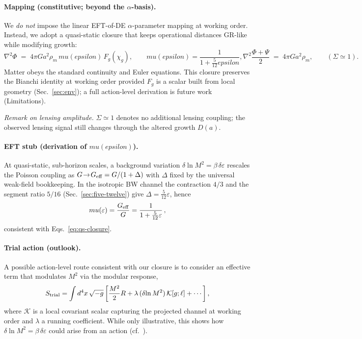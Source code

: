\documentclass[aps,prd,onecolumn,superscriptaddress,nofootinbib]{revtex4-2}
\def\eps{epsilon}%
\def\mu{mu}%
\def\alpha{alpha}%
\def\alpha_M{alphaM}%
\providecommand{\eps}{\varepsilon}
\providecommand{\be}{\begin{equation}}
\providecommand{\ee}{\end{equation}}
\providecommand{\bse}{\begin{subequations}}
\providecommand{\ese}{\end{subequations}}
\begin{document}
\paragraph{Mapping (constitutive; beyond the \texorpdfstring{$\alpha$}{alpha}-basis).}
We \emph{do not} impose the linear EFT-of-DE $\alpha$-parameter mapping at working order. Instead, we adopt a quasi-static closure that keeps operational distances GR-like while modifying growth:
\bse
\label{eq:qs-closure}
\be
\nabla^2\Phi \;=\; 4\pi G a^2 \rho_m \,\mu(\eps)\,F_g(\chi_g), \qquad \mu(\eps)=\frac{1}{1+\tfrac{5}{12}\eps}, 
\ee
\be
\nabla^2\frac{\Phi+\Psi}{2} \;=\; 4\pi G a^2 \rho_m ,\qquad (\Sigma\simeq 1).
\ee
\ese
Matter obeys the standard continuity and Euler equations. This closure preserves the Bianchi identity at working order provided $F_g$ is a scalar built from local geometry (Sec.~\ref{sec:env}); a full action-level derivation is future work (Limitations).

\noindent\emph{Remark on lensing amplitude.} $\Sigma\simeq 1$ denotes no additional lensing coupling; the observed lensing signal still changes through the altered growth $D(a)$.

\paragraph{EFT stub (derivation of $\mu(\eps)$).}
At quasi-static, sub-horizon scales, a background variation $\delta\ln M^2=\beta\,\delta\varepsilon$ rescales the Poisson coupling as $G\!\to\!G_{\rm eff}=G/(1+\Delta)$ with $\Delta$ fixed by the universal weak-field bookkeeping. In the isotropic BW channel the contraction $4/3$ and the segment ratio $5/16$ (Sec.~\ref{sec:five-twelve}) give $\Delta=\tfrac{5}{12}\varepsilon$, hence
\be
\mu(\varepsilon)=\frac{G_{\rm eff}}{G}=\frac{1}{1+\tfrac{5}{12}\varepsilon}\,,
\label{eq:eft-stub}
\ee
consistent with Eqs.~\eqref{eq:qs-closure}.

\paragraph{Trial action (outlook).}
A possible action-level route consistent with our closure is to consider an effective term that modulates \(M^2\) via the modular response,
\[
S_{\rm trial}=\int d^4x \,\sqrt{-g}\left[\frac{M^2}{2}R + \lambda\,(\delta\!\ln M^2)\,\mathcal{K}[g;\ell] + \cdots\right],
\]
where \(\mathcal K\) is a local covariant scalar capturing the projected channel at working order and \(\lambda\) a running coefficient. While only illustrative, this shows how \(\delta\!\ln M^2=\beta\,\delta\varepsilon\) could arise from an action (cf.\ \cite{Jacobson2016,Lashkari2014}).
\end{document}
